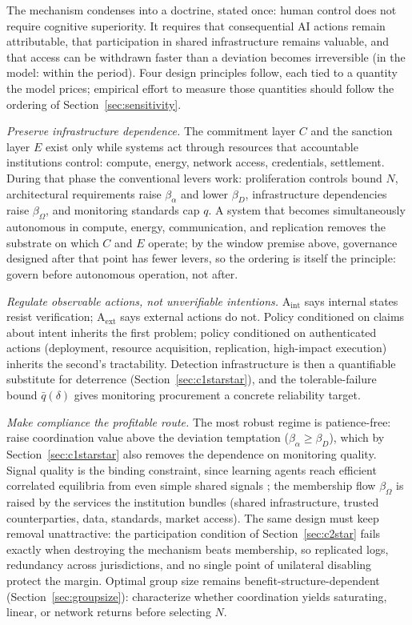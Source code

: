 \documentclass[manuscript,screen,review]{jair}
\begin{document}
The mechanism condenses into a doctrine, stated once: human control does not require cognitive superiority. It requires that consequential AI actions remain attributable, that participation in shared infrastructure remains valuable, and that access can be withdrawn faster than a deviation becomes irreversible (in the model: within the period). Four design principles follow, each tied to a quantity the model prices; empirical effort to measure those quantities should follow the ordering of Section~\ref{sec:sensitivity}.

\emph{Preserve infrastructure dependence.} The commitment layer $C$ and the sanction layer $E$ exist only while systems act through resources that accountable institutions control: compute, energy, network access, credentials, settlement. During that phase the conventional levers work: proliferation controls bound $N$, architectural requirements raise $\beta_\alpha$ and lower $\beta_D$, infrastructure dependencies raise $\beta_\Omega$, and monitoring standards cap $q$. A system that becomes simultaneously autonomous in compute, energy, communication, and replication removes the substrate on which $C$ and $E$ operate; by the window premise above, governance designed after that point has fewer levers, so the ordering is itself the principle: govern before autonomous operation, not after.

\emph{Regulate observable actions, not unverifiable intentions.} A$_{\mathrm{int}}$ says internal states resist verification; A$_{\mathrm{ext}}$ says external actions do not. Policy conditioned on claims about intent inherits the first problem; policy conditioned on authenticated actions (deployment, resource acquisition, replication, high-impact execution) inherits the second's tractability. Detection infrastructure is then a quantifiable substitute for deterrence (Section~\ref{sec:c1starstar}), and the tolerable-failure bound $\bar q(\delta)$ gives monitoring procurement a concrete reliability target.

\emph{Make compliance the profitable route.} The most robust regime is patience-free: raise coordination value above the deviation temptation ($\beta_\alpha \geq \beta_D$), which by Section~\ref{sec:c1starstar} also removes the dependence on monitoring quality. Signal quality is the binding constraint, since learning agents reach efficient correlated equilibria from even simple shared signals \cite{cigler.2013}; the membership flow $\beta_\Omega$ is raised by the services the institution bundles (shared infrastructure, trusted counterparties, data, standards, market access). The same design must keep removal unattractive: the participation condition of Section~\ref{sec:c2star} fails exactly when destroying the mechanism beats membership, so replicated logs, redundancy across jurisdictions, and no single point of unilateral disabling protect the margin. Optimal group size remains benefit-structure-dependent (Section~\ref{sec:groupsize}): characterize whether coordination yields saturating, linear, or network returns before selecting $N$.
\end{document}
